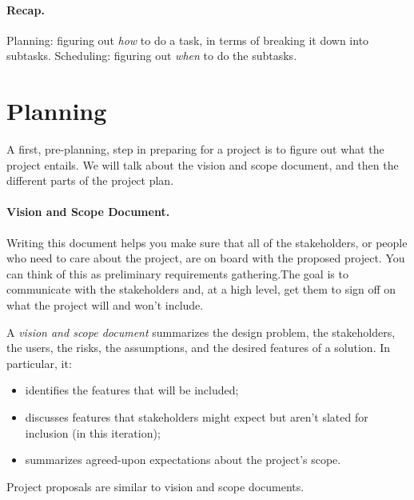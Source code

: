 \paragraph{Recap.} Planning: figuring out \emph{how} to do a task, in terms of
breaking it down into subtasks. Scheduling: figuring out \emph{when}
to do the subtasks.

\section*{Planning}
A first, pre-planning, step in preparing for a project is to figure
out what the project entails. We will talk about the vision and scope document,
and then the different parts of the project plan.

\paragraph{Vision and Scope Document.} 
Writing this document helps you make sure that all of the
stakeholders, or people who need to care about the project, are on
board with the proposed project. You can think of this as preliminary
requirements gathering.The goal is to communicate with the stakeholders and, at a high
level, get them to sign off on what the project will and won't
include.

A \emph{vision and scope document} summarizes the design problem, the
stakeholders, the users, the risks, the assumptions, and the desired
features of a solution. In particular, it:
\begin{itemize}
\item identifies the features that will be included;
\item discusses features that stakeholders might expect but aren't slated
for inclusion (in this iteration);
\item summarizes agreed-upon expectations about the project's scope.
\end{itemize}
Project proposals are similar to vision and scope documents.

